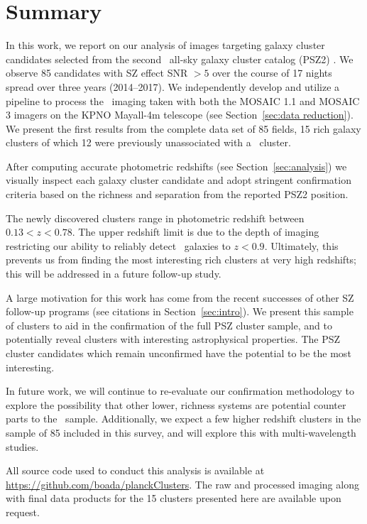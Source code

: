 \documentclass[apj, revtex4-1]{emulateapj}
\begin{document}
\section{Summary}\label{sec:summary}
In this work, we report on our analysis of images targeting galaxy cluster candidates selected from the second \planck\ all-sky galaxy cluster catalog (PSZ2) \citep{PlanckCollaboration2015a}. We observe 85 candidates with SZ effect SNR $>5$ over the course of 17 nights spread over three years (2014--2017). We independently develop and utilize a pipeline to process the \sdssg\sdssr\sdssi\sdssz\ imaging taken with both the MOSAIC 1.1 and MOSAIC 3 imagers on the KPNO Mayall-4m telescope (see Section~\ref{sec:data reduction}). We present the first results from the complete data set of 85 fields, 15 rich galaxy clusters of which 12 were previously unassociated with a \planck\ cluster.

After computing accurate photometric redshifts (see Section~\ref{sec:analysis}) we visually inspect each galaxy cluster candidate and adopt stringent confirmation criteria based on the richness and separation from the reported PSZ2 position.

The newly discovered clusters range in photometric redshift between $0.13 < z < 0.78$. The upper redshift limit is due to the depth of imaging restricting our ability to reliably detect \lstar\ galaxies to $z<0.9$. Ultimately, this prevents us from finding the most interesting rich clusters at very high redshifts; this will be addressed in a future follow-up study.

A large motivation for this work has come from the recent successes of other SZ follow-up programs (see citations in Section~\ref{sec:intro}). We present this sample of clusters to aid in the confirmation of the full PSZ cluster sample, and to potentially reveal clusters with interesting astrophysical properties. The PSZ cluster candidates which remain unconfirmed have the potential to be the most interesting.

In future work, we will continue to re-evaluate our confirmation methodology to explore the possibility that other lower, richness systems are potential counter parts to the \planck\ sample. Additionally, we expect a few higher redshift clusters in the sample of 85 included in this survey, and will explore this with multi-wavelength studies.

All source code used to conduct this analysis is available at \url{https://github.com/boada/planckClusters}. The raw and processed imaging along with final data products for the 15 clusters presented here are available upon request.
\end{document}
